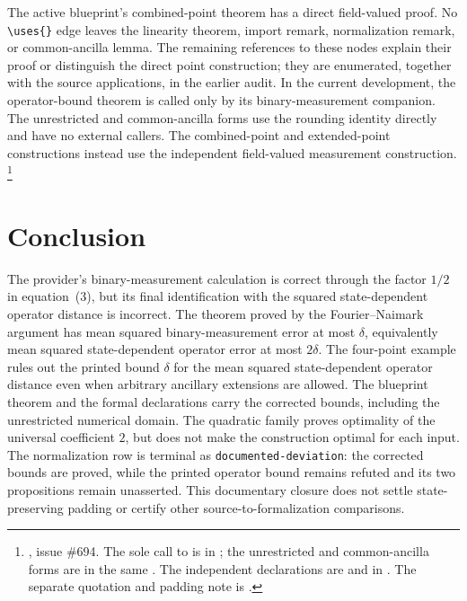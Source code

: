 \documentclass[11pt]{article}
\begin{document}
The active blueprint's combined-point theorem has a direct field-valued
proof. No \verb|\uses{}| edge leaves the linearity theorem, import remark,
normalization remark, or common-ancilla lemma. The remaining references to
these nodes explain their proof or distinguish the direct point construction;
they are enumerated, together with the source applications, in the earlier
audit. In the current \Lean{} development, the operator-bound theorem is
called only by its binary-measurement companion. The unrestricted and
common-ancilla forms use the rounding identity directly and have no external
callers. The combined-point and extended-point constructions instead use the
independent field-valued measurement construction.%
\footnote{, issue \#694.
The sole call to  is in
;
the unrestricted and common-ancilla forms are in the same
.
The independent declarations are  and
 in
.
The separate quotation and padding note is
.}

\section{Conclusion}

The provider's binary-measurement calculation is correct through the factor
$1/2$ in equation~(3), but its final identification with the squared
state-dependent operator distance is incorrect.  The theorem proved by the
Fourier--Naimark argument has mean squared binary-measurement error at most
$\delta$, equivalently mean squared state-dependent operator error at most
$2\delta$.  The four-point example rules out the printed bound $\delta$ for
the mean squared state-dependent operator distance even when arbitrary
ancillary extensions are allowed.  The blueprint theorem and the formal
declarations carry the corrected bounds, including the unrestricted numerical
domain. The quadratic family proves optimality of the universal coefficient
$2$, but does not make the construction optimal for each input. The
normalization row is terminal as \texttt{documented-deviation}: the corrected
bounds are proved, while the printed operator bound remains refuted and its
two propositions remain unasserted. This documentary closure does not settle
state-preserving padding or certify other source-to-formalization comparisons.



\end{document}
